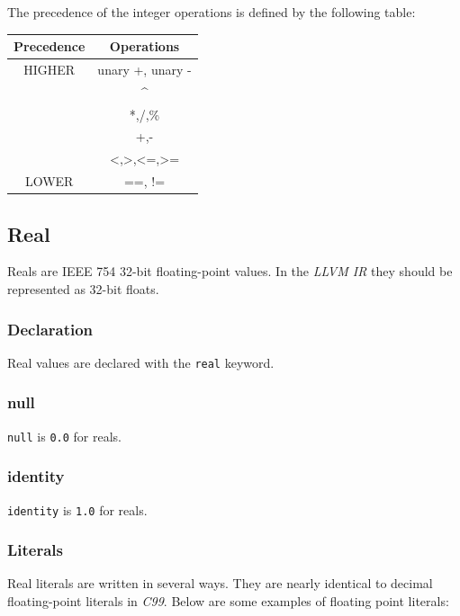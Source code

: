 \documentclass{article}
\begin{document}
		The precedence of the integer operations is defined by the following table:

		\begin{center}
			\begin{tabular}{|c|c|}
			\hline
			\textbf{Precedence} & \textbf{Operations} \\
			\hline
			HIGHER & unary +, unary - \\
			       & \textasciicircum \\
			       & *,/,\%		        \\
			       & +,-   		        \\
			       & <,>,<=,>=        \\
			LOWER  & ==, !=		        \\
			\hline
			\end{tabular}
		\end{center}


	\subsection{Real}\label{sec:real}

		Reals are IEEE 754 32-bit floating-point values. In the \textit{LLVM IR} they should be represented as 32-bit
		floats.

	\subsubsection{Declaration}

		Real values are declared with the \texttt{real} keyword.

	\subsubsection{null}

		\texttt{null} is \texttt{0.0} for reals.

	\subsubsection{identity}

		\texttt{identity} is \texttt{1.0} for reals.

	\subsubsection{Literals}

		Real literals are written in several ways. They are nearly identical to decimal floating-point literals in
		\textit{C99}. Below are some examples of floating point literals:
\end{document}
